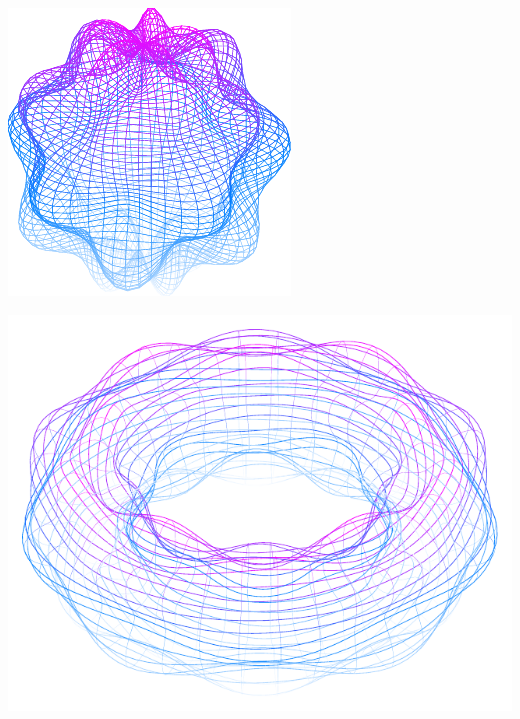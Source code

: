 \documentclass[11pt,openany]{article}
\begin{document}
\vfill
\begin{center}
\begin{minipage}{.32\textwidth}\centering
	\includegraphics[scale=.8]{../tikz/grad-math-tikz-pdf/sphere2.pdf}
\end{minipage}\hfill
\begin{minipage}{.32\textwidth}\centering
	\includegraphics[scale=.45]{../tikz/grad-math-tikz-pdf/torus2.pdf}
\end{minipage}\hfill
\begin{minipage}{.32\textwidth}\centering

\end{minipage}
\end{center}
\end{document}
